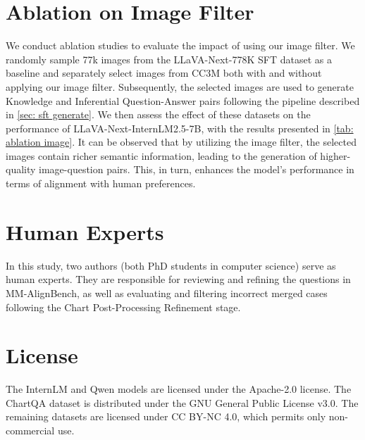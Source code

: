 
\section{Ablation on Image Filter}
\label{appx: filterablation}
We conduct ablation studies to evaluate the impact of using our image filter. We randomly sample 77k images from the LLaVA-Next-778K SFT dataset as a baseline and separately select images from CC3M both with and without applying our image filter. 
Subsequently, the selected images are used to generate Knowledge and Inferential Question-Answer pairs following the pipeline described in \cref{sec: sft generate}.  
We then assess the effect of these datasets on the performance of LLaVA-Next-InternLM2.5-7B, with the results presented in \cref{tab: ablation image}. 
It can be observed that by utilizing the image filter, the selected images contain richer semantic information, leading to the generation of higher-quality image-question pairs. This, in turn, enhances the model's performance in terms of alignment with human preferences.

\section{Human Experts}
In this study, two authors (both PhD students in computer science) serve as human experts. They are responsible for reviewing and refining the questions in MM-AlignBench, as well as evaluating and filtering incorrect merged cases following the Chart Post-Processing Refinement stage.

\section{License}
The InternLM and Qwen  models are licensed under the Apache-2.0  license. The ChartQA dataset is distributed under the GNU General Public License v3.0. The remaining datasets are licensed under CC BY-NC 4.0, which permits only non-commercial use.

